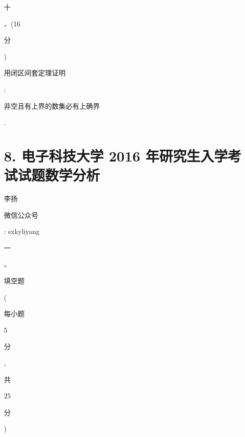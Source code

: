 \documentclass[10pt]{article}
\begin{document}
\begin{CJK}{UTF8}{mj}十\end{CJK}、(16 \begin{CJK}{UTF8}{mj}分\end{CJK}) \begin{CJK}{UTF8}{mj}用闭区间套定理证明\end{CJK}: \begin{CJK}{UTF8}{mj}非空且有上界的数集必有上确界\end{CJK}.

\section{8. 电子科技大学 2016 年研究生入学考试试题数学分析}
\begin{CJK}{UTF8}{mj}李扬\end{CJK}

\begin{CJK}{UTF8}{mj}微信公众号\end{CJK}: sxkyliyang

\begin{CJK}{UTF8}{mj}一\end{CJK}、\begin{CJK}{UTF8}{mj}填空题\end{CJK}(\begin{CJK}{UTF8}{mj}每小题\end{CJK} 5 \begin{CJK}{UTF8}{mj}分\end{CJK}, \begin{CJK}{UTF8}{mj}共\end{CJK} 25 \begin{CJK}{UTF8}{mj}分\end{CJK})
\end{document}

